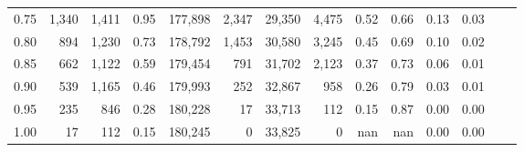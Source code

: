 \begin{tabular}{rrrrrrrrrrrrrr}
0.75 &   1,340 &  1,411 &    0.95 &  177,898 &    2,347 &  29,350 &   4,475 &  0.52 &  0.66 &  0.13 &      0.03 \\
0.80 &     894 &  1,230 &    0.73 &  178,792 &    1,453 &  30,580 &   3,245 &  0.45 &  0.69 &  0.10 &      0.02 \\
0.85 &     662 &  1,122 &    0.59 &  179,454 &      791 &  31,702 &   2,123 &  0.37 &  0.73 &  0.06 &      0.01 \\
0.90 &     539 &  1,165 &    0.46 &  179,993 &      252 &  32,867 &     958 &  0.26 &  0.79 &  0.03 &      0.01 \\
0.95 &     235 &    846 &    0.28 &  180,228 &       17 &  33,713 &     112 &  0.15 &  0.87 &  0.00 &      0.00 \\
1.00 &      17 &    112 &    0.15 &  180,245 &        0 &  33,825 &       0 &   nan &   nan &  0.00 &      0.00 \\
\bottomrule
\end{tabular}
